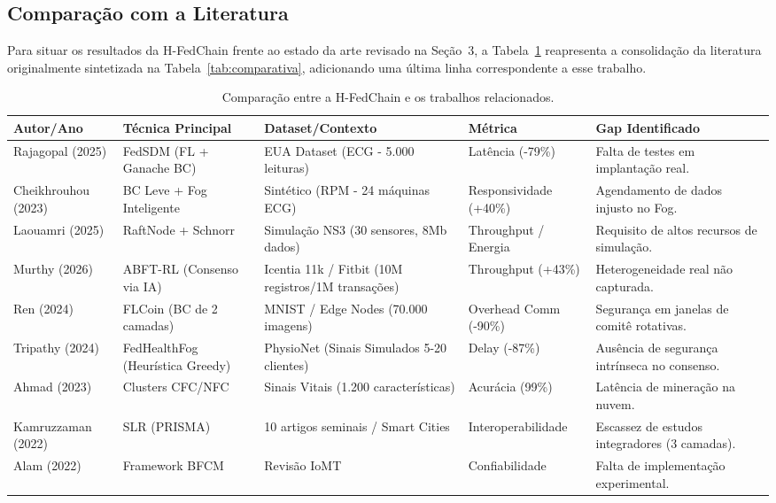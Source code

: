 \documentclass[12pt]{article}
\begin{document}
\subsection{Comparação com a Literatura}

Para situar os resultados da H-FedChain frente ao estado da arte revisado na Seção~3, a Tabela~\ref{tab:comparacao-literatura} reapresenta a consolidação da literatura originalmente sintetizada na Tabela~\ref{tab:comparativa}, adicionando uma última linha correspondente a esse trabalho.

\begin{table}[htbp]
\centering
\caption{Comparação entre a H-FedChain e os trabalhos relacionados.}
\label{tab:comparacao-literatura}
\small
\begin{tabular}{p{2.1cm}p{2.6cm}p{2.6cm}p{2.3cm}p{3.2cm}}
\hline
\textbf{Autor/Ano} & \textbf{Técnica Principal} & \textbf{Dataset/Contexto} & \textbf{Métrica} & \textbf{Gap Identificado} \\
\hline
Rajagopal (2025) & FedSDM (FL + Ganache BC) & EUA Dataset (ECG - 5.000 leituras) & Latência (-79\%) & Falta de testes em implantação real. \\
Cheikhrouhou (2023) & BC Leve + Fog Inteligente & Sintético (RPM - 24 máquinas ECG) & Responsividade (+40\%) & Agendamento de dados injusto no Fog. \\
Laouamri (2025) & RaftNode + Schnorr & Simulação NS3 (30 sensores, 8Mb dados) & Throughput / Energia & Requisito de altos recursos de simulação. \\
Murthy (2026) & ABFT-RL (Consenso via IA) & Icentia 11k / Fitbit (10M registros/1M transações) & Throughput (+43\%) & Heterogeneidade real não capturada. \\
Ren (2024) & FLCoin (BC de 2 camadas) & MNIST / Edge Nodes (70.000 imagens) & Overhead Comm (-90\%) & Segurança em janelas de comitê rotativas. \\
Tripathy (2024) & FedHealthFog (Heurística Greedy) & PhysioNet (Sinais Simulados 5-20 clientes) & Delay (-87\%) & Ausência de segurança intrínseca no consenso. \\
Ahmad (2023) & Clusters CFC/NFC & Sinais Vitais (1.200 características) & Acurácia (99\%) & Latência de mineração na nuvem. \\
Kamruzzaman (2022) & SLR (PRISMA) & 10 artigos seminais / Smart Cities & Interoperabilidade & Escassez de estudos integradores (3 camadas). \\
Alam (2022) & Framework BFCM & Revisão IoMT & Confiabilidade & Falta de implementação experimental. \\

\end{tabular}
\end{table}
\end{document}
